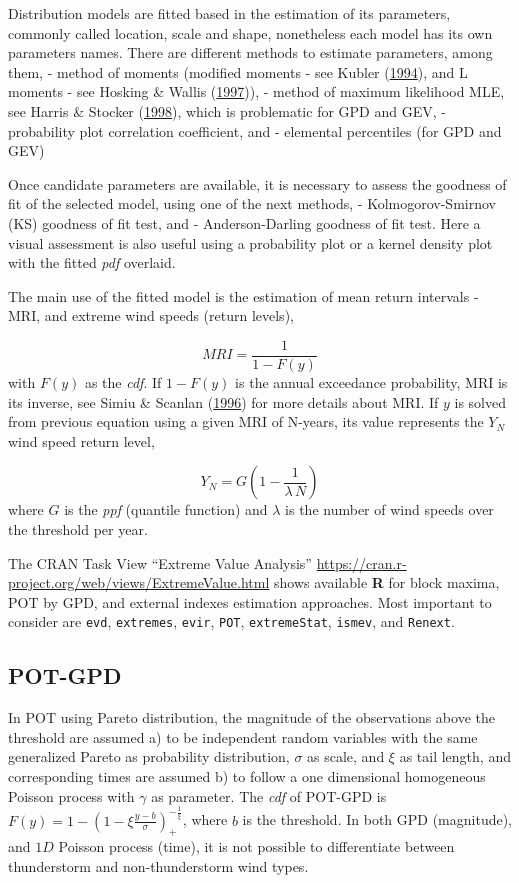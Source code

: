 \documentclass[12pt,oneside]{reedthesis}
\begin{document}
Distribution models are fitted based in the estimation of its parameters, commonly called location, scale and shape, nonetheless each model has its own parameters names. There are different methods to estimate parameters, among them, - method of moments (modified moments - see Kubler (\protect\hyperlink{ref-Kubler1994}{1994}), and L moments - see Hosking \& Wallis (\protect\hyperlink{ref-Hosking1997}{1997})), - method of maximum likelihood MLE, see Harris \& Stocker (\protect\hyperlink{ref-Harris1994}{1998}), which is problematic for GPD and GEV, - probability plot correlation coefficient, and - elemental percentiles (for GPD and GEV)

Once candidate parameters are available, it is necessary to assess the goodness of fit of the selected model, using one of the next methods, - Kolmogorov-Smirnov (KS) goodness of fit test, and - Anderson-Darling goodness of fit test. Here a visual assessment is also useful using a probability plot or a kernel density plot with the fitted \emph{pdf} overlaid.

The main use of the fitted model is the estimation of mean return intervals - MRI, and extreme wind speeds (return levels),

\[
MRI=\frac{1}{1-F(y)}
\]
with \(F(y)\) as the \emph{cdf}. If \(1-F(y)\) is the annual exceedance probability, MRI is its inverse, see Simiu \& Scanlan (\protect\hyperlink{ref-Simiu1996}{1996}) for more details about MRI. If \(y\) is solved from previous equation using a given MRI of N-years, its value represents the \(Y_N\) wind speed return level,

\[
Y_N = G\left(1-\frac{1}{\lambda\,N}\right)
\]
where \(G\) is the \emph{ppf} (quantile function) and \(\lambda\) is the number of wind speeds over the threshold per year.

The CRAN Task View ``Extreme Value Analysis'' \url{https://cran.r-project.org/web/views/ExtremeValue.html} shows available \textbf{R} for block maxima, POT by GPD, and external indexes estimation approaches. Most important to consider are \texttt{evd}, \texttt{extremes}, \texttt{evir}, \texttt{POT}, \texttt{extremeStat}, \texttt{ismev}, and \texttt{Renext}.

\hypertarget{pot-gpd}{%
\subsection{POT-GPD}\label{pot-gpd}}

In POT using Pareto distribution, the magnitude of the observations above the threshold are assumed a) to be independent random variables with the same generalized Pareto as probability distribution, \(\sigma\) as scale, and \(\xi\) as tail length, and corresponding times are assumed b) to follow a one dimensional homogeneous Poisson process with \(\gamma\) as parameter. The \emph{cdf} of POT-GPD is \(F(y) = 1 - \left(1-\xi\frac{y-b}{\sigma}\right)^{-\frac{1}{\xi}}_+\), where \(b\) is the threshold. In both GPD (magnitude), and \(1D\) Poisson process (time), it is not possible to differentiate between thunderstorm and non-thunderstorm wind types.
\end{document}
